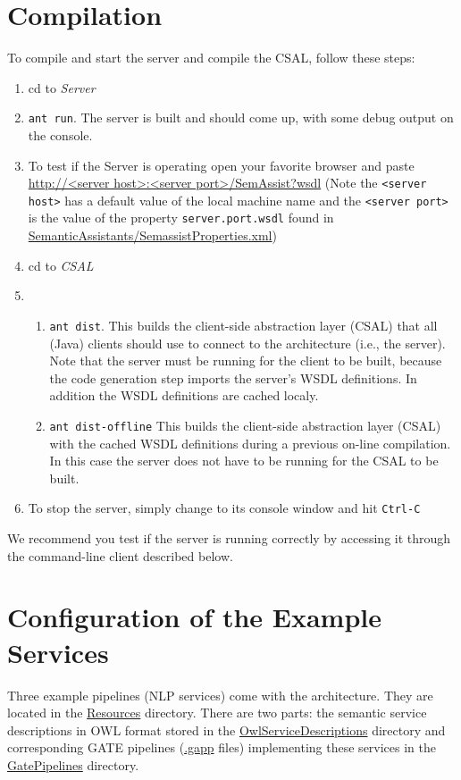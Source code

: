 \section{Compilation} 
\label{sec:inst-comp}
To compile and start the
server and compile the CSAL, follow these steps:

\begin{enumerate}
  \item cd to \emph{Server}
  \item \texttt{ant run}. The server is built and should come up, with
    some debug output on the console.
  \item To test if the Server is operating open your favorite browser and paste  \url{http://<server host>:<server port>/SemAssist?wsdl}
(Note the \texttt{<server host>} has a default value of the local machine name and the \texttt{<server port>} is the value of the property \texttt{server.port.wsdl}
found in \url{SemanticAssistants/SemassistProperties.xml})
  \item cd to \emph{CSAL}
  \item 
\begin{enumerate}
\item  \texttt{ant dist}. This builds the client-side abstraction
    layer (CSAL) that all (Java) clients should use to connect to the
    architecture (i.e., the server). Note that the server must be
    running for the client to be built, because the code generation
    step imports the server's WSDL definitions. In addition the WSDL definitions
    are cached localy.
\item  \texttt{ant dist-offline}
This builds the client-side abstraction
layer (CSAL) with the cached WSDL definitions during a previous on-line compilation.
In this case the server does not have to be running for the CSAL to be built.
\end{enumerate}

  \item To stop the server, simply change to its console window and
    hit \texttt{Ctrl-C}
\end{enumerate}
We recommend you test if the server is running correctly by accessing
it through the command-line client described below.

\section{Configuration of the Example Services}
Three example pipelines (NLP services) come with the architecture.
They are located in the \url{Resources} directory. There are two
parts: the semantic service descriptions in OWL format stored in the
\url{OwlServiceDescriptions} directory and corresponding GATE
pipelines (\url{.gapp} files) implementing these services in the
\url{GatePipelines} directory.

